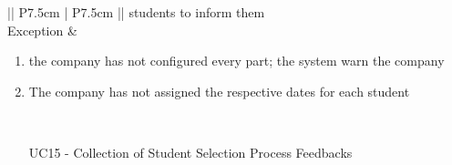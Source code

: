 \begin{table} [H]
\begin{tabular}{|| P{7.5cm} | P{7.5cm} ||}
						students to inform them   \\
						\hline
						Exception & \parbox{5cm}{\begin{enumerate}[label=\alpha]
								\item the company has not configured 
								every part; the system warn the 
								company
								\item The company has not assigned 
								the respective dates for each 
								student \\
						\end{enumerate}} \\
						\hline
					\end{tabular}
				\end{table}
				
				
				\begin{table} [H]
					\centering
					\begin{itemize}
						\item [UC15] - Collection of Student Selection Process Feedbacks
					\end{itemize}
					

\end{table}
